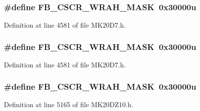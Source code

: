 \subsubsection[{\texorpdfstring{F\+B\+\_\+\+C\+S\+C\+R\+\_\+\+W\+R\+A\+H\+\_\+\+M\+A\+SK}{FB_CSCR_WRAH_MASK}}]{\setlength{\rightskip}{0pt plus 5cm}\#define F\+B\+\_\+\+C\+S\+C\+R\+\_\+\+W\+R\+A\+H\+\_\+\+M\+A\+SK~0x30000u}\hypertarget{group___f_b___register___masks_ga2843fc1784996e04d8a936a38da538af}{}\label{group___f_b___register___masks_ga2843fc1784996e04d8a936a38da538af}


Definition at line 4581 of file M\+K20\+D7.\+h.

\subsubsection[{\texorpdfstring{F\+B\+\_\+\+C\+S\+C\+R\+\_\+\+W\+R\+A\+H\+\_\+\+M\+A\+SK}{FB_CSCR_WRAH_MASK}}]{\setlength{\rightskip}{0pt plus 5cm}\#define F\+B\+\_\+\+C\+S\+C\+R\+\_\+\+W\+R\+A\+H\+\_\+\+M\+A\+SK~0x30000u}\hypertarget{group___f_b___register___masks_ga2843fc1784996e04d8a936a38da538af}{}\label{group___f_b___register___masks_ga2843fc1784996e04d8a936a38da538af}


Definition at line 4581 of file M\+K20\+D7.\+h.

\subsubsection[{\texorpdfstring{F\+B\+\_\+\+C\+S\+C\+R\+\_\+\+W\+R\+A\+H\+\_\+\+M\+A\+SK}{FB_CSCR_WRAH_MASK}}]{\setlength{\rightskip}{0pt plus 5cm}\#define F\+B\+\_\+\+C\+S\+C\+R\+\_\+\+W\+R\+A\+H\+\_\+\+M\+A\+SK~0x30000u}\hypertarget{group___f_b___register___masks_ga2843fc1784996e04d8a936a38da538af}{}\label{group___f_b___register___masks_ga2843fc1784996e04d8a936a38da538af}


Definition at line 5165 of file M\+K20\+D\+Z10.\+h.

